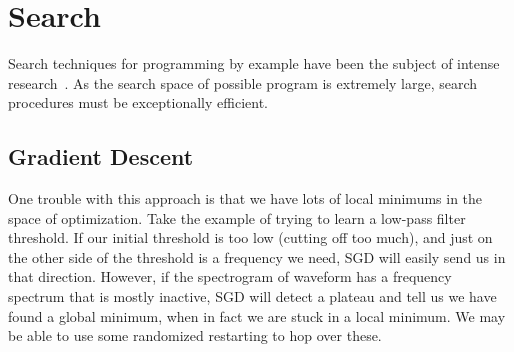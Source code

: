 \section{Search}

Search techniques for programming by example have been the subject of intense research~\cite{?,?,?}.
As the search space of possible program is extremely large, search procedures must be exceptionally efficient. 


\subsection{Gradient Descent}

One trouble with this approach is that we have lots of local minimums in the space of optimization.
Take the example of trying to learn a low-pass filter threshold.
If our initial threshold is too low (cutting off too much), and just on the other side of the threshold is a frequency we need, SGD will easily send us in that direction.
However, if the spectrogram of waveform has a frequency spectrum that is mostly inactive, SGD will detect a plateau and tell us we have found a global minimum, when in fact we are stuck in a local minimum.
We may be able to use some randomized restarting to hop over these.


